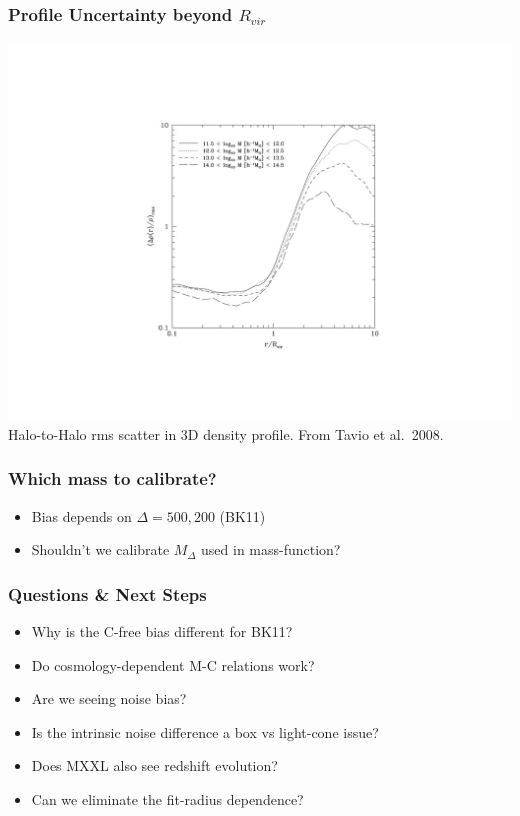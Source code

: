 \documentclass{beamer}
\begin{document}

\begin{frame}
\frametitle{Profile Uncertainty beyond $R_{vir}$}

\centering

\includegraphics[height=0.85\textheight]{tavio_profile_uncertainty}\\
\tiny{Halo-to-Halo rms scatter in 3D density profile. From Tavio et al.\ 2008.}

\end{frame}


\begin{frame}
\frametitle{Which mass to calibrate?}

\begin{itemize}
\item Bias depends on $\Delta = {500, 200}$ (BK11)
\item Shouldn't we calibrate $M_{\Delta}$ used in mass-function?
\end{itemize}

\end{frame}


\begin{frame}
\frametitle{Questions \& Next Steps}

\begin{itemize}
\item Why is the C-free bias different for BK11?
\item Do cosmology-dependent M-C relations work?
\item Are we seeing noise bias?
\item Is the intrinsic noise difference a box vs light-cone issue?
\item Does MXXL also see redshift evolution?
\item Can we eliminate the fit-radius dependence?
\end{itemize}

\end{frame}
\end{document}
